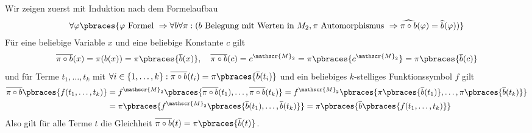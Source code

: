 \begin{solution}

	Wir zeigen zuerst mit Induktion nach dem Formelaufbau
	\begin{align*}
	\forall \varphi \pbraces{\varphi \text{ Formel } \Rightarrow \forall b \forall \pi: (b \text{ Belegung mit Werten in } M_2, \pi \text{ Automorphismus } \Rightarrow \widehat{\pi \circ b}(\varphi) = \widehat{b}(\varphi))}
	\end{align*}
	Für eine beliebige Variable $x$ und eine beliebige Konstante $c$ gilt
	\begin{align*}
	\overline{\pi \circ b}(x) = \pi(b(x)) = \pi\pbraces{\overline{b}(x)}, \quad \overline{\pi \circ b}(c) = c^{\mathscr{M}_2} = \pi\pbraces{c^{\mathscr{M}_2}}= \pi\pbraces{\overline{b}(c)}
	\end{align*}
	und für Terme $t_1, \dots, t_k$ mit $\forall i \in \{1, \dots, k\}: \overline{\pi \circ b}(t_i) = \pi\pbraces{\overline{b}(t_i)}$ und ein beliebiges $k$-stelliges Funktionssymbol $f$ gilt
	\begin{align*}
	\overline{\pi \circ b}\pbraces{f(t_1, \dots, t_k)} &= f^{\mathscr{M}_2}\pbraces{\overline{\pi \circ b}(t_1), \dots , \overline{\pi \circ b}(t_k)} = f^{\mathscr{M}_2}\pbraces{\pi\pbraces{\overline{b}(t_1)}, \dots, \pi\pbraces{\overline{b}(t_k)}} \\
	&= \pi \pbraces{f^{\mathscr{M}_2}\pbraces{\overline{b}(t_1), \dots, \overline{b}(t_k)}} = \pi \pbraces{\overline{b} \pbraces{f(t_1, \dots, t_k)}}
	\end{align*}
	Also gilt für alle Terme $t$ die Gleichheit $\overline{\pi \circ b}(t) = \pi\pbraces{\overline{b}(t)}$.


\end{solution}
